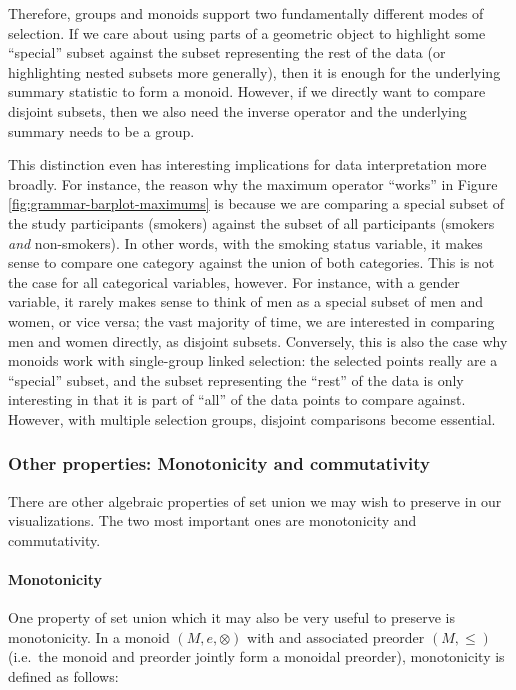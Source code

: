 \documentclass[
  openany]{book}
\theoremstyle{definition}
\theoremstyle{definition}
\theoremstyle{definition}
\theoremstyle{definition}
\theoremstyle{remark}
\begin{document}
Therefore, groups and monoids support two fundamentally different modes of selection. If we care about using parts of a geometric object to highlight some ``special'' subset against the subset representing the rest of the data (or highlighting nested subsets more generally), then it is enough for the underlying summary statistic to form a monoid. However, if we directly want to compare disjoint subsets, then we also need the inverse operator and the underlying summary needs to be a group.

This distinction even has interesting implications for data interpretation more broadly. For instance, the reason why the maximum operator ``works'' in Figure \ref{fig:grammar-barplot-maximums} is because we are comparing a special subset of the study participants (smokers) against the subset of all participants (smokers \emph{and} non-smokers). In other words, with the smoking status variable, it makes sense to compare one category against the union of both categories. This is not the case for all categorical variables, however. For instance, with a gender variable, it rarely makes sense to think of men as a special subset of men and women, or vice versa; the vast majority of time, we are interested in comparing men and women directly, as disjoint subsets. Conversely, this is also the case why monoids work with single-group linked selection: the selected points really are a ``special'' subset, and the subset representing the ``rest'' of the data is only interesting in that it is part of ``all'' of the data points to compare against. However, with multiple selection groups, disjoint comparisons become essential.

\subsubsection{Other properties: Monotonicity and commutativity}\label{monotonicity-commutativity}

There are other algebraic properties of set union we may wish to preserve in our visualizations. The two most important ones are monotonicity and commutativity.

\paragraph{Monotonicity}\label{monotonicity}

One property of set union which it may also be very useful to preserve is monotonicity. In a monoid \((M, e, \otimes)\) with and associated preorder \((M, \leq)\) (i.e.~the monoid and preorder jointly form a monoidal preorder), monotonicity is defined as follows:
\end{document}
